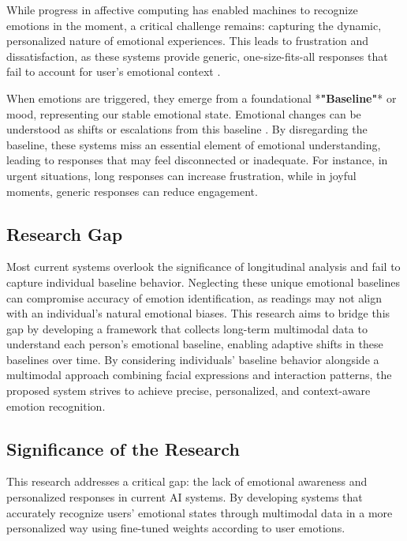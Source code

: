 \par While progress in affective computing has enabled machines to recognize emotions in the moment, a critical challenge remains: capturing the dynamic, personalized nature of emotional experiences. This leads to frustration and dissatisfaction, as these systems provide generic, one-size-fits-all responses that fail to account for user's emotional context \citep{kim2024understanding}.

\par When emotions are triggered, they emerge from a foundational *\textbf{"Baseline"}* or mood, representing our stable emotional state. Emotional changes can be understood as shifts or escalations from this baseline \citep{davidson1998affective}. By disregarding the baseline, these systems miss an essential element of emotional understanding, leading to responses that may feel disconnected or inadequate. For instance, in urgent situations, long responses can increase frustration, while in joyful moments, generic responses can reduce engagement.


\subsection{Research Gap}

\par Most current systems overlook the significance of longitudinal analysis and fail to capture individual baseline behavior. Neglecting these unique emotional baselines can compromise accuracy of emotion identification, as readings may not align with an individual's natural emotional biases. This research aims to bridge this gap by developing a framework that collects long-term multimodal data to understand each person's emotional baseline, enabling adaptive shifts in these baselines over time. By considering individuals' baseline behavior alongside a multimodal approach combining facial expressions and interaction patterns, the proposed system strives to achieve precise, personalized, and context-aware emotion recognition.

\subsection{Significance of the Research}

\par This research addresses a critical gap: the lack of emotional awareness and personalized responses in current AI systems. By developing systems that accurately recognize users' emotional states through multimodal data in a more personalized way using fine-tuned weights according to user emotions.

